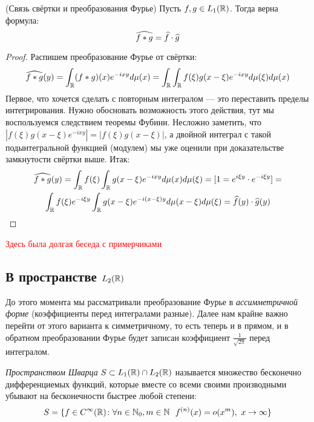 \begin{proposition} (Связь свёртки и преобразования Фурье)
	Пусть $f, g \in L_1(\mathbb{R})$. Тогда верна формула:
	\[
		\widehat{f * g} = \widehat{f} \cdot \widehat{g} 
	\]
\end{proposition}

\begin{proof}
	Распишем преобразование Фурье от свёртки:
	\[
		\widehat{f * g}(y) = \int_{\mathbb{R}} (f * g)(x)e^{-ixy}d\mu(x) = \int_{\mathbb{R}} \int_{\mathbb{R}} f(\xi)g(x - \xi)e^{-ixy}d\mu(\xi)d\mu(x)
	\]
	Первое, что хочется сделать с повторным интегралом --- это переставить пределы интегрирования. Нужно обосновать возможность этого действия, тут мы воспользуемся следствием теоремы Фубини. Несложно заметить, что $|f(\xi)g(x - \xi)e^{-ixy}| = |f(\xi)g(x - \xi)|$, а двойной интеграл с такой подынтегральной функцией (модулем) мы уже оценили при доказательстве замкнутости свёртки выше. Итак:
	\begin{multline*}
		\widehat{f * g}(y) = \int_{\mathbb{R}} f(\xi) \int_{\mathbb{R}} g(x - \xi)e^{-ixy}d\mu(x)d\mu(\xi) = [1 = e^{i\xi y} \cdot e^{-i\xi y}] =
		\\
		\int_{\mathbb{R}} f(\xi)e^{-i\xi y} \int_{\mathbb{R}} g(x - \xi)e^{-i(x - \xi)y}d\mu(x - \xi)d\mu(\xi) = \widehat{f}(y) \cdot \widehat{g}(y)
	\end{multline*}
	 
\end{proof}

\textcolor{red}{Здесь была долгая беседа с примерчиками}

\subsection{В пространстве $L_2(\mathbb{R})$}

\begin{note}
	До этого момента мы рассматривали преобразование Фурье в \textit{ассимметричной форме} (коэффициенты перед интегралами разные). Далее нам крайне важно перейти от этого варианта к симметричному, то есть теперь и в прямом, и в обратном преобразовании Фурье будет записан коэффициент $\frac{1}{\sqrt{2\pi}}$ перед интегралом.
\end{note}

\begin{reminder}
	\textit{Пространством Шварца} $S \subset L_1(\mathbb{R}) \cap L_2(\mathbb{R})$ называется множество бесконечно дифференциемых функций, которые вместе со всеми своими производными убывают на бесконечности быстрее любой степени:
	\[
		S = \{f \in C^\infty(\mathbb{R}) \colon \forall n \in \mathbb{N}_0, m \in \mathbb{N}\ \ f^{(n)}(x) = o(x^m),\ x \to \infty\}
	\]
\end{reminder}

